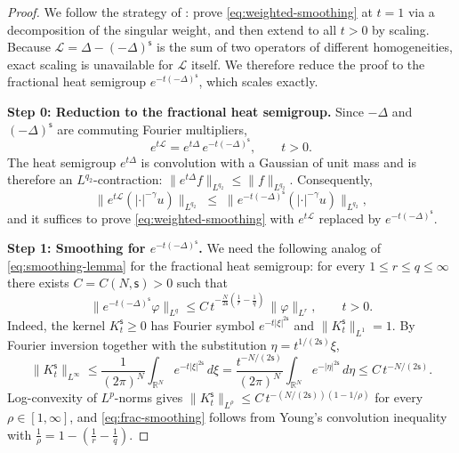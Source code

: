 \documentclass[12pt,reqno]{amsart}
\theoremstyle{plain}
\theoremstyle{definition}
\theoremstyle{remark}
\numberwithin{equation}{section}
\newcommand{\ts}{\mathsf{s}}
\begin{document}
\begin{proof}
We follow the strategy of \cite[Proposition~2.1]{BTW}: prove \eqref{eq:weighted-smoothing} at $t=1$ via a decomposition of the singular weight, and then extend to all $t>0$ by scaling. Because $\mathscr{L}=\Delta-(-\Delta)^{\ts}$ is the sum of two operators of different homogeneities, exact scaling is unavailable for $\mathscr{L}$ itself. We therefore reduce the proof to the fractional heat semigroup $e^{-t(-\Delta)^{\ts}}$, which scales exactly.

\medskip
\noindent\textbf{Step 0: Reduction to the fractional heat semigroup.}
Since $-\Delta$ and $(-\Delta)^{\ts}$ are commuting Fourier multipliers,
\begin{equation}\label{eq:semi-factor}
e^{t\mathscr{L}}=e^{t\Delta}\,e^{-t(-\Delta)^{\ts}},\qquad t>0.
\end{equation}
The heat semigroup $e^{t\Delta}$ is convolution with a Gaussian of unit mass and is therefore an $L^{q_{2}}$-contraction: $\|e^{t\Delta}f\|_{L^{q_{2}}}\leq\|f\|_{L^{q_{2}}}$. Consequently,
\[
\bigl\|e^{t\mathscr{L}}(|\cdot|^{-\gamma}u)\bigr\|_{L^{q_{2}}}
\;\leq\;\bigl\|e^{-t(-\Delta)^{\ts}}(|\cdot|^{-\gamma}u)\bigr\|_{L^{q_{2}}},
\]
and it suffices to prove \eqref{eq:weighted-smoothing} with $e^{t\mathscr{L}}$ replaced by $e^{-t(-\Delta)^{\ts}}$.

\medskip
\noindent\textbf{Step 1: Smoothing for $e^{-t(-\Delta)^{\ts}}$.}
We need the following analog of \eqref{eq:smoothing-lemma} for the fractional heat semigroup: for every $1\leq r\leq q\leq\infty$ there exists $C=C(N,\ts)>0$ such that
\begin{equation}\label{eq:frac-smoothing}
\bigl\|e^{-t(-\Delta)^{\ts}}\varphi\bigr\|_{L^{q}}
\leq C\, t^{-\frac{N}{2\ts}\left(\frac{1}{r}-\frac{1}{q}\right)}\,\|\varphi\|_{L^{r}},
\qquad t>0.
\end{equation}
Indeed, the kernel $K_{t}^{\ts}\geq 0$ has Fourier symbol $e^{-t|\xi|^{2\ts}}$ and $\|K_{t}^{\ts}\|_{L^{1}}=1$. By Fourier inversion together with the substitution $\eta=t^{1/(2\ts)}\xi$,
\[
\|K_{t}^{\ts}\|_{L^{\infty}}
\leq \frac{1}{(2\pi)^{N}}\int_{\mathbb{R}^{N}} e^{-t|\xi|^{2\ts}}\,d\xi
= \frac{t^{-N/(2\ts)}}{(2\pi)^{N}}\int_{\mathbb{R}^{N}} e^{-|\eta|^{2\ts}}\,d\eta
\leq C\, t^{-N/(2\ts)}.
\]
Log-convexity of $L^{p}$-norms gives $\|K_{t}^{\ts}\|_{L^{\rho}}\leq C\, t^{-(N/(2\ts))(1-1/\rho)}$ for every $\rho\in[1,\infty]$, and \eqref{eq:frac-smoothing} follows from Young's convolution inequality with $\frac{1}{\rho}=1-(\frac{1}{r}-\frac{1}{q})$.


\end{proof}
\end{document}

